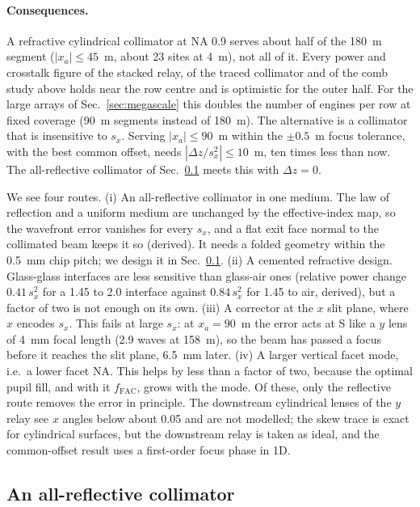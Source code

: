 \paragraph{Consequences.} A refractive cylindrical collimator at NA 0.9 serves about half of the 180~\textmu m segment ($|x_a|\leq45$~\textmu m, about 23 sites at 4~\textmu m), not all of it. Every power and crosstalk figure of the stacked relay, of the traced collimator and of the comb study above holds near the row centre and is optimistic for the outer half. For the large arrays of Sec.~\ref{sec:megascale} this doubles the number of engines per row at fixed coverage (90~\textmu m segments instead of 180~\textmu m). The alternative is a collimator that is insensitive to $s_x$. Serving $|x_a|\leq90$~\textmu m within the $\pm0.5$~\textmu m focus tolerance, with the best common offset, needs $|\Delta z/s_x^2|\leq10$~\textmu m, ten times less than now. The all-reflective collimator of Sec.~\ref{sec:combine-reflective} meets this with $\Delta z=0$.

We see four routes. (i) An all-reflective collimator in one medium. The law of reflection and a uniform medium are unchanged by the effective-index map, so the wavefront error vanishes for every $s_x$, and a flat exit face normal to the collimated beam keeps it so (derived). It needs a folded geometry within the 0.5~mm chip pitch; we design it in Sec.~\ref{sec:combine-reflective}. (ii) A cemented refractive design. Glass-glass interfaces are less sensitive than glass-air ones (relative power change $0.41\,s_x^2$ for a 1.45 to 2.0 interface against $0.84\,s_x^2$ for 1.45 to air, derived), but a factor of two is not enough on its own. (iii) A corrector at the $x$ slit plane, where $x$ encodes $s_x$. This fails at large $s_x$: at $x_a=90$~\textmu m the error acts at S like a $y$ lens of 4~mm focal length (2.9 waves at 158~\textmu m), so the beam has passed a focus before it reaches the slit plane, 6.5~mm later. (iv) A larger vertical facet mode, i.e.\ a lower facet NA. This helps by less than a factor of two, because the optimal pupil fill, and with it $f_\mathrm{FAC}$, grows with the mode. Of these, only the reflective route removes the error in principle. The downstream cylindrical lenses of the $y$ relay see $x$ angles below about 0.05 and are not modelled; the skew trace is exact for cylindrical surfaces, but the downstream relay is taken as ideal, and the common-offset result uses a first-order focus phase in 1D.

\subsection{An all-reflective collimator}\label{sec:combine-reflective}


